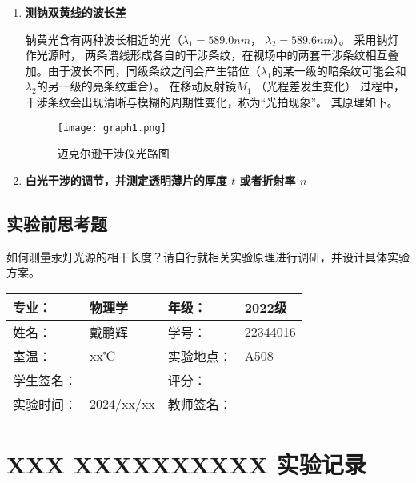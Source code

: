 \documentclass[dvipsnames, svgnames,a4paper,11pt]{article}
\begin{document}
	\begin{enumerate}
		\item \textbf{测钠双黄线的波长差}
			
			钠黄光含有两种波长相近的光（$\lambda_1 = 589.0 nm$， $\lambda_2 = 589.6 nm$）。 采用钠灯作光源时， 两条谱线形成各自的干涉条纹，在视场中的两套干涉条纹相互叠加。由于波长不同，同级条纹之间会产生错位（$\lambda_1$的某一级的暗条纹可能会和 $\lambda_2$的另一级的亮条纹重合）。 在移动反射镜$M_1$ （光程差发生变化） 过程中，干涉条纹会出现清晰与模糊的周期性变化，称为“光拍现象”。 其原理如下。
			
			\begin{figure}[htbp]
				\centering
				\texttt{[image: graph1.png]}
				\caption{迈克尔逊干涉仪光路图}
				\label{fig:fig1}
			\end{figure}
			
			
			
			
		\item \textbf{白光干涉的调节，并测定透明薄片的厚度 $t$ 或者折射率 $n$}
		
		
		
		
	\end{enumerate}

	




\subsection{实验前思考题}
	\begin{question}
		如何测量汞灯光源的相干长度？请自行就相关实验原理进行调研，并设计具体实验方案。
	\end{question}
	
	

\clearpage
\begin{table}
	\renewcommand\arraystretch{1.7}
	\centering
	\begin{tabularx}{\textwidth}{|X|X|X|X|}
	\hline
	专业：& 物理学 &年级：& 2022级 \\
	\hline
	姓名：& 戴鹏辉 & 学号：& 22344016 \\
	\hline
	室温：& xx℃ & 实验地点： & A508 \\
	\hline
	学生签名：& & 评分： &\\
	\hline
	实验时间：& 2024/xx/xx & 教师签名：&\\
	\hline
	\end{tabularx}
\end{table}

\section{XXX \quad XXXXXXXXXX \quad\heiti 实验记录}
\end{document}
